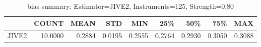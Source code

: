 \begin{table}[ht]
\centering
\caption{bias summary: Estimator=JIVE2, Instruments=125, Strength=0.80}
\begin{tabular}{lrrrrrrrr}
\toprule
 & COUNT & MEAN & STD & MIN & 25\% & 50\% & 75\% & MAX \\
\midrule
JIVE2 & 10.0000 & 0.2884 & 0.0195 & 0.2555 & 0.2764 & 0.2930 & 0.3050 & 0.3088 \\
\bottomrule
\end{tabular}
\end{table}
